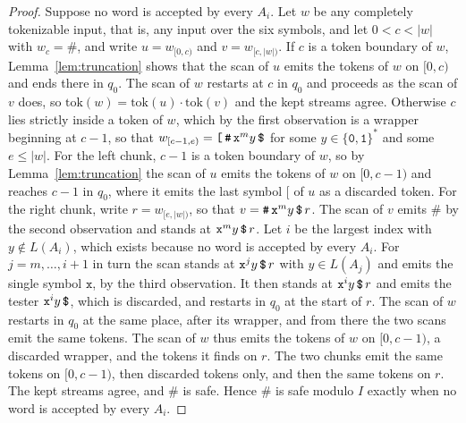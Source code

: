 \documentclass[11pt,a4paper]{article}
\theoremstyle{definition}
\theoremstyle{plain}
\newcommand{\code}[1]{\texttt{#1}}
\begin{document}
\begin{proof}
Suppose no word is accepted by every $A_i$. Let $w$ be any completely tokenizable input, that is, any input over the six
symbols, and let $0 < c < |w|$ with $w_c = \code{\#}$, and write $u = w_{[0,c)}$ and $v = w_{[c,|w|)}$. If $c$ is a
token boundary of $w$, Lemma~\ref{lem:truncation} shows that the scan of $u$ emits the tokens of $w$ on $[0, c)$ and
ends there in $q_0$. The scan of $w$ restarts at $c$ in $q_0$ and proceeds as the scan of $v$ does, so
$\mathrm{tok}(w) = \mathrm{tok}(u) \cdot \mathrm{tok}(v)$ and the kept streams agree. Otherwise $c$ lies strictly inside
a token of $w$, which by the first observation is a wrapper beginning at $c - 1$, so that
$w_{[c-1,e)} = \code{[}\,\code{\#}\,\code{x}^m y\,\code{\symbol{36}}$ for some $y \in \{\code{0}, \code{1}\}^*$ and some
$e \leq |w|$. For the left chunk, $c - 1$ is a token boundary of $w$, so by Lemma~\ref{lem:truncation} the scan of $u$
emits the tokens of $w$ on $[0, c - 1)$ and reaches $c - 1$ in $q_0$, where it emits the last symbol $\code{[}$ of $u$
as a discarded token. For the right chunk, write $r = w_{[e,|w|)}$, so that
$v = \code{\#}\,\code{x}^m y\,\code{\symbol{36}}\,r$. The scan of $v$ emits $\code{\#}$ by the second observation and
stands at $\code{x}^m y\,\code{\symbol{36}}\,r$. Let $i$ be the largest index with $y \notin L(A_i)$, which exists
because no word is accepted by every $A_i$. For $j = m, \ldots, i + 1$ in turn the scan stands at
$\code{x}^j y\,\code{\symbol{36}}\,r$ with $y \in L(A_j)$ and emits the single symbol $\code{x}$, by the third
observation. It then stands at $\code{x}^i y\,\code{\symbol{36}}\,r$ and emits the tester
$\code{x}^i y\,\code{\symbol{36}}$, which is discarded, and restarts in $q_0$ at the start of $r$. The scan of $w$
restarts in $q_0$ at the same place, after its wrapper, and from there the two scans emit the same tokens. The scan of
$w$ thus emits the tokens of $w$ on $[0, c - 1)$, a discarded wrapper, and the tokens it finds on $r$. The two chunks
emit the same tokens on $[0, c - 1)$, then discarded tokens only, and then the same tokens on $r$. The kept streams
agree, and $\code{\#}$ is safe. Hence $\code{\#}$ is safe modulo $I$ exactly when no word is accepted by every $A_i$.


\end{proof}
\end{document}
